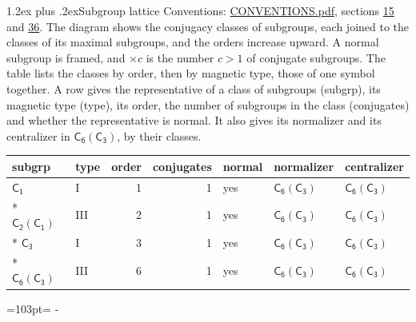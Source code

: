 \documentclass[10pt,a4paper]{article}
\makeatletter
\renewcommand\section{\@startsection{section}{1}{\z@}{-3ex plus -1ex minus -.2ex}%
  {1.2ex plus .2ex}{\normalfont\large\sffamily\bfseries\color{parttitle}}}
\newcommand{\needspace}[1]{\par\penalty-100\begingroup\dimen0=#1\relax\dimen2=\pagegoal
  \advance\dimen2-\pagetotal\ifdim\dimen0>\dimen2\relax\ifdim\dimen2>0pt\vfil\break\fi\fi
  \endgroup}
\numberwithin{equation}{section}
\newcommand{\grp}[1]{\mathsf{#1}}
\makeatother
\begin{document}
\section{Subgroup lattice}\label{s:subgroups}
Conventions: \href{../../CONVENTIONS.pdf}{CONVENTIONS.pdf}, sections \href{../../../rotation/CONVENTIONS.pdf\#conv.15}{15} and \href{../../CONVENTIONS.pdf\#conv.36}{36}.
The diagram shows the conjugacy classes of subgroups, each joined to the classes of its maximal subgroups, and the orders increase upward. \label{n:index.conjugates.c}A normal subgroup is framed, and ${\times}c$ is the number $c > 1$ of conjugate subgroups. The table lists the classes by order, then by magnetic type, those of one symbol together. \label{n:head.subgroup}\label{n:head.magnetic.type}\label{n:head.order}\label{n:head.conjugates}\label{n:head.normal}A row gives the representative of a class of subgroups (subgrp), its magnetic type (type), its order, the number of subgroups in the class (conjugates) and whether the representative is normal. \label{n:head.normalizer}\label{n:head.centralizer}It also gives its normalizer and its centralizer in $\grp{C_{6}}(\grp{C_{3}})$, by their classes. 
\begin{center}
\end{center}
{\small\begin{longtable}{@{}llrrlll@{}}\toprule
subgrp & type & order & conjugates & normal & normalizer & centralizer\\\midrule\endhead
\bottomrule\endfoot\endlastfoot
\href{../../../rotation/data/pdf/C1.pdf}{$\grp{C_{1}}$} & I & 1 & 1 & yes & \href{C6-C3.pdf}{$\grp{C_{6}}(\grp{C_{3}})$} & \href{C6-C3.pdf}{$\grp{C_{6}}(\grp{C_{3}})$}\\*
\href{C2-C1.pdf}{$\grp{C_{2}}(\grp{C_{1}})$} & III & 2 & 1 & yes & \href{C6-C3.pdf}{$\grp{C_{6}}(\grp{C_{3}})$} & \href{C6-C3.pdf}{$\grp{C_{6}}(\grp{C_{3}})$}\\*
\href{../../../rotation/data/pdf/C3.pdf}{$\grp{C_{3}}$} & I & 3 & 1 & yes & \href{C6-C3.pdf}{$\grp{C_{6}}(\grp{C_{3}})$} & \href{C6-C3.pdf}{$\grp{C_{6}}(\grp{C_{3}})$}\\*
\href{C6-C3.pdf}{$\grp{C_{6}}(\grp{C_{3}})$} & III & 6 & 1 & yes & \href{C6-C3.pdf}{$\grp{C_{6}}(\grp{C_{3}})$} & \href{C6-C3.pdf}{$\grp{C_{6}}(\grp{C_{3}})$}\\
\bottomrule\end{longtable}}
\needspace{103pt}
\end{document}
